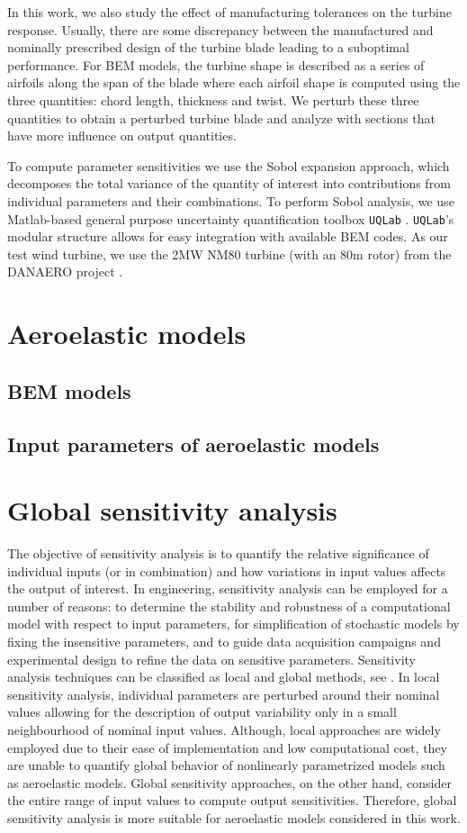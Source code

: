 \documentclass[review]{elsarticle}
\numberwithin{equation}{section}
\numberwithin{equation}{section}
\begin{document}
In this work, we also study the effect of manufacturing tolerances on the turbine response. Usually, there are some discrepancy between the  manufactured and nominally prescribed design of the turbine blade leading to a suboptimal performance. For BEM models, the turbine shape is described as a series of airfoils along the span of the blade where each airfoil shape is computed using the three quantities: chord length, thickness and twist. We perturb these three quantities to obtain a perturbed turbine blade and analyze with sections that have more influence on output quantities. 

To compute parameter sensitivities we use the Sobol expansion approach, which decomposes the total variance of the quantity of interest into contributions from individual parameters and their combinations. To perform Sobol analysis, we use Matlab-based general purpose uncertainty quantification toolbox \texttt{UQLab} \cite{uqlab}. \texttt{UQLab}'s modular structure allows for easy integration with available BEM codes. As our test wind turbine, we use the 2MW NM80 turbine (with an 80m rotor) from the DANAERO project \cite{DANAERO}.
\section{Aeroelastic models}
\subsection{BEM models}
\subsection{Input parameters of aeroelastic models}
\section{Global sensitivity analysis}
The objective of sensitivity analysis is to quantify the relative significance of individual inputs (or in combination) and how variations in input values affects the output of interest. In engineering, sensitivity analysis can be employed for a number of reasons: to determine the stability and robustness of a computational model with respect to input parameters, for simplification of stochastic models by fixing the insensitive parameters, and to guide data acquisition campaigns and experimental design to refine the data on sensitive parameters. Sensitivity analysis techniques can be classified as local and global methods, see \cite{RSmith}. In local sensitivity analysis, individual parameters are perturbed around their nominal values allowing for the description of output variability only in a small neighbourhood of nominal input values. Although, local approaches are widely employed due to their ease of implementation and low computational cost, they are unable to quantify global behavior of nonlinearly parametrized models such as aeroelastic models. Global sensitivity approaches, on the other hand, consider the entire range of input values to compute output sensitivities. Therefore, global sensitivity analysis is more suitable for aeroelastic models considered in this work.  
\end{document}
